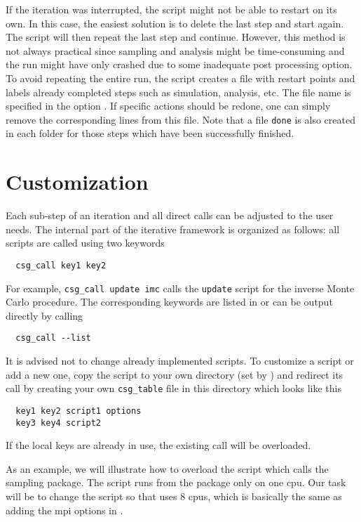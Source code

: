 If the iteration was interrupted, the script  might not be able to restart on its own. In this case, the easiest solution is to delete the last step and start again. The script will then repeat the last step and continue. However, this method is not always practical since sampling and analysis might be time-consuming and the run might have only crashed due to some inadequate post processing option. To avoid repeating the entire run, the script  creates a file with restart points and labels already completed steps such as simulation, analysis, etc. The file name is specified in the option . If specific actions should be redone, one can simply remove the corresponding lines from this file. Note that a file \texttt{done} is also created in each folder for those steps which have been successfully finished.

\section{Customization}
Each sub-step of an iteration and all direct calls can be adjusted to the user needs. The internal part of the iterative framework is organized as follows: all scripts are called using two keywords
\begin{verbatim}
  csg_call key1 key2
\end{verbatim}
For example, \texttt{csg\_call update imc} calls the \texttt{update} script for the inverse Monte Carlo procedure. The corresponding keywords are listed in  or can be output directly by calling
\begin{verbatim}
  csg_call --list
\end{verbatim}

It is advised not to change already implemented scripts. To customize a script or add a new one, copy the script to your own directory (set by ) and redirect its call by creating your own \texttt{csg\_table} file in this directory which looks like this
\begin{verbatim}
  key1 key2 script1 options
  key3 key4 script2
\end{verbatim}
If the local keys are already in use, the existing call will be overloaded.

As an example, we will illustrate how to overload the script which calls the sampling package. 
The  script runs  from the \gromacs package only on one cpu. Our task will be to change the script so that \gromacs uses 8 cpus, which is basically the same as adding the mpi options in .

